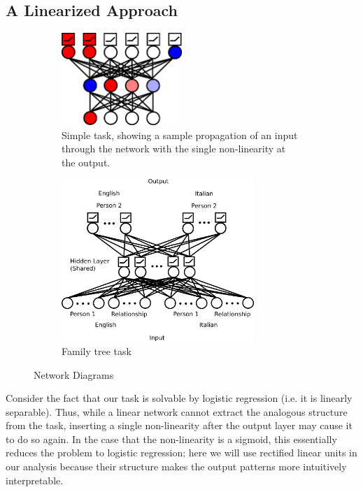 \documentclass[10pt,letterpaper]{article}
\begin{document}
\subsection{A Linearized Approach}
\begin{figure}
\centering
\begin{subfigure}{0.5\textwidth}
\centering
\includegraphics[width=0.5\textwidth]{figures/network_diagram.png}
\caption{Simple task, showing a sample propagation of an input through the network with the single non-linearity at the output.}
\label{network_diagram}
\vspace*{1em}
\end{subfigure}
\begin{subfigure}{0.5\textwidth}
\centering
\includegraphics[width=0.8\textwidth]{figures/family_tree_network_diagram.png}
\caption{Family tree task}
\label{family_tree_network_diagram}
\end{subfigure}
\caption{Network Diagrams}
\end{figure}
Consider the fact that our task is solvable by logistic regression (i.e. it is linearly separable). Thus, while a linear network cannot extract the analogous structure from the task, inserting a single non-linearity after the output layer may cause it to do so again. In the case that the non-linearity is a sigmoid, this essentially reduces the problem to logistic regression; here we will use rectified linear units in our analysis because their structure makes the output patterns more intuitively interpretable. \par 
\end{document}
